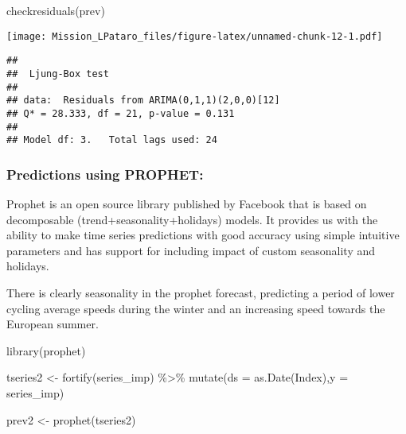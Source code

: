 \documentclass[
]{article}
\newenvironment{Shaded}{\begin{snugshade}}{\end{snugshade}}
\newcommand{\AttributeTok}[1]{\textcolor[rgb]{0.77,0.63,0.00}{#1}}
\newcommand{\FunctionTok}[1]{\textcolor[rgb]{0.00,0.00,0.00}{#1}}
\newcommand{\NormalTok}[1]{#1}
\newcommand{\OtherTok}[1]{\textcolor[rgb]{0.56,0.35,0.01}{#1}}
\newcommand{\SpecialCharTok}[1]{\textcolor[rgb]{0.00,0.00,0.00}{#1}}
\begin{document}
\begin{Shaded}
\begin{Highlighting}[]
\FunctionTok{checkresiduals}\NormalTok{(prev)}
\end{Highlighting}
\end{Shaded}

\texttt{[image: Mission\_LPataro\_files/figure-latex/unnamed-chunk-12-1.pdf]}

\begin{verbatim}
## 
##  Ljung-Box test
## 
## data:  Residuals from ARIMA(0,1,1)(2,0,0)[12]
## Q* = 28.333, df = 21, p-value = 0.131
## 
## Model df: 3.   Total lags used: 24
\end{verbatim}

\hypertarget{predictions-using-prophet}{%
\subsubsection{Predictions using
PROPHET:}\label{predictions-using-prophet}}

Prophet is an open source library published by Facebook that is based on
decomposable (trend+seasonality+holidays) models. It provides us with
the ability to make time series predictions with good accuracy using
simple intuitive parameters and has support for including impact of
custom seasonality and holidays.

There is clearly seasonality in the prophet forecast, predicting a
period of lower cycling average speeds during the winter and an
increasing speed towards the European summer.

\begin{Shaded}
\begin{Highlighting}[]
\FunctionTok{library}\NormalTok{(prophet)}
\end{Highlighting}
\end{Shaded}

\begin{Shaded}
\begin{Highlighting}[]
\NormalTok{tseries2 }\OtherTok{\textless{}{-}} \FunctionTok{fortify}\NormalTok{(series\_imp) }\SpecialCharTok{\%\textgreater{}\%} 
  \FunctionTok{mutate}\NormalTok{(}\AttributeTok{ds =} \FunctionTok{as.Date}\NormalTok{(Index),}\AttributeTok{y =}\NormalTok{ series\_imp)}

\NormalTok{prev2 }\OtherTok{\textless{}{-}} \FunctionTok{prophet}\NormalTok{(tseries2)}
\end{Highlighting}
\end{Shaded}
\end{document}

